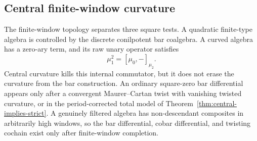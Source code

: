 \subsection{Central finite-window curvature}

The finite-window topology separates three square tests.  A quadratic
finite-type algebra is controlled by the discrete conilpotent bar
coalgebra.  A curved algebra has a zero-ary term, and its raw unary
operator satisfies
\[
\mu_1^2=[\mu_0,-]_{\mu_2}.
\]
Central curvature kills this internal commutator, but it does not
erase the curvature from the bar construction.  An ordinary
square-zero bar differential appears only after a convergent
Maurer--Cartan twist with vanishing twisted curvature, or in the
period-corrected total model of
Theorem~\ref{thm:central-implies-strict}.  A genuinely filtered
algebra has non-descendant composites in arbitrarily high windows, so
the bar differential, cobar differential, and twisting cochain exist
only after finite-window completion.

